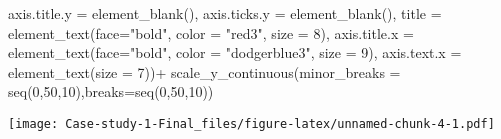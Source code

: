 \documentclass[
]{article}
\newenvironment{Shaded}{\begin{snugshade}}{\end{snugshade}}
\newcommand{\AttributeTok}[1]{\textcolor[rgb]{0.77,0.63,0.00}{#1}}
\newcommand{\DecValTok}[1]{\textcolor[rgb]{0.00,0.00,0.81}{#1}}
\newcommand{\FunctionTok}[1]{\textcolor[rgb]{0.00,0.00,0.00}{#1}}
\newcommand{\NormalTok}[1]{#1}
\newcommand{\SpecialCharTok}[1]{\textcolor[rgb]{0.00,0.00,0.00}{#1}}
\newcommand{\StringTok}[1]{\textcolor[rgb]{0.31,0.60,0.02}{#1}}
\begin{document}
\begin{Shaded}
\begin{Highlighting}[]
        \AttributeTok{axis.title.y =} \FunctionTok{element\_blank}\NormalTok{(),}
        \AttributeTok{axis.ticks.y =} \FunctionTok{element\_blank}\NormalTok{(),}
        \AttributeTok{title =} \FunctionTok{element\_text}\NormalTok{(}\AttributeTok{face=}\StringTok{"bold"}\NormalTok{, }\AttributeTok{color =} \StringTok{"red3"}\NormalTok{, }\AttributeTok{size =} \DecValTok{8}\NormalTok{),}
        \AttributeTok{axis.title.x =} \FunctionTok{element\_text}\NormalTok{(}\AttributeTok{face=}\StringTok{"bold"}\NormalTok{, }\AttributeTok{color =} \StringTok{"dodgerblue3"}\NormalTok{, }\AttributeTok{size =} \DecValTok{9}\NormalTok{),}
        \AttributeTok{axis.text.x =} \FunctionTok{element\_text}\NormalTok{(}\AttributeTok{size =} \DecValTok{7}\NormalTok{))}\SpecialCharTok{+}
  \FunctionTok{scale\_y\_continuous}\NormalTok{(}\AttributeTok{minor\_breaks =} \FunctionTok{seq}\NormalTok{(}\DecValTok{0}\NormalTok{,}\DecValTok{50}\NormalTok{,}\DecValTok{10}\NormalTok{),}\AttributeTok{breaks=}\FunctionTok{seq}\NormalTok{(}\DecValTok{0}\NormalTok{,}\DecValTok{50}\NormalTok{,}\DecValTok{10}\NormalTok{))}
\end{Highlighting}
\end{Shaded}

\texttt{[image: Case-study-1-Final\_files/figure-latex/unnamed-chunk-4-1.pdf]}
\end{document}
